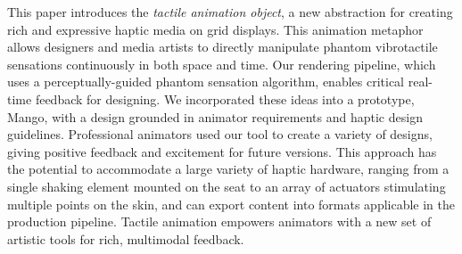 This paper introduces the \emph{tactile animation object}, a new abstraction for creating rich and expressive haptic media on grid displays.
This animation metaphor allows designers and media artists to directly manipulate phantom vibrotactile sensations continuously in both space and time.
Our rendering pipeline, which uses a perceptually-guided phantom sensation algorithm, enables critical real-time feedback for designing.
We incorporated these ideas into a prototype, Mango, with a design grounded in animator requirements and haptic design guidelines.
Professional animators used our tool to create a variety of designs, giving positive feedback and excitement for future versions.
This approach has the potential to %
accommodate a large variety of haptic hardware, ranging from a single shaking element mounted on the seat to an array of actuators stimulating multiple points on the skin, and can export content into formats applicable in the production pipeline.
Tactile animation empowers animators with a new set of artistic tools for rich, multimodal feedback. 



